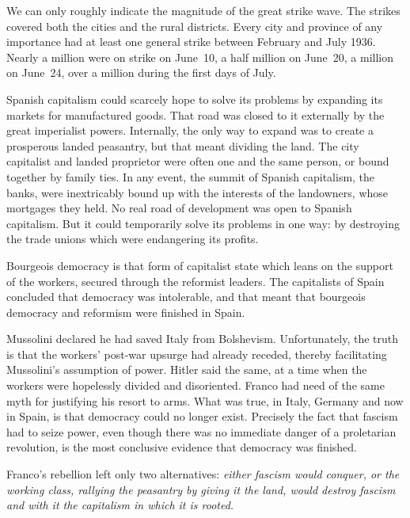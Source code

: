 We can only roughly indicate the magnitude of the great strike wave. The strikes covered both the cities and the rural districts. Every city and province of any importance had at least one general strike between February and July 1936. Nearly a million were on strike on June~10, a half million on June~20, a million on June~24, over a million during the first days of July.

Spanish capitalism could scarcely hope to solve its problems by expanding its markets for manufactured goods. That road was closed to it externally by the great imperialist powers. Internally, the only way to expand was to create a prosperous landed peasantry, but that meant dividing the land. The city capitalist and landed proprietor were often one and the same person, or bound together by family ties. In any event, the summit of Spanish capitalism, the banks, were inextricably bound up with the interests of the landowners, whose mortgages they held. No real road of development was open to Spanish capitalism. But it could temporarily solve its problems in one way: by destroying the trade unions which were endangering its profits.

Bourgeois democracy is that form of capitalist state which leans on the support of the workers, secured through the reformist leaders. The capitalists of Spain concluded that democracy was intolerable, and that meant that bourgeois democracy and reformism were finished in Spain.

Mussolini declared he had saved Italy from Bolshevism. Unfortunately, the truth is that the workers’ post-war upsurge had already receded, thereby facilitating Mussolini’s assumption of power. Hitler said the same, at a time when the workers were hopelessly divided and disoriented. Franco had need of the same myth for justifying his resort to arms. What was true, in Italy, Germany and now in Spain, is that democracy could no longer exist. Precisely the fact that fascism had to seize power, even though there was no immediate danger of a proletarian revolution, is the most conclusive evidence that democracy was finished.

Franco’s rebellion left only two alternatives: \emph{either fascism would conquer, or the working class, rallying the peasantry by giving it the land, would destroy fascism and with it the capitalism in which it is rooted.}

